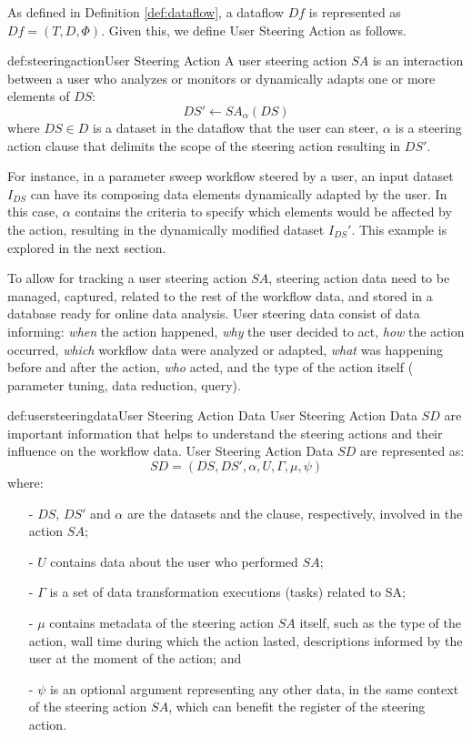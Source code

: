 As defined in Definition \ref{def:dataflow}, a dataflow $Df$ is represented as $Df = (T,D,\Phi)$. Given this, we define User Steering Action as follows.

\begin{mydef}{def:steeringaction}{User Steering Action}
A user steering action $SA$ is an interaction between a user who analyzes or monitors or dynamically adapts one or more elements of $DS$:
$$DS' \leftarrow SA_\alpha(DS)$$
where $DS \in D$ is a dataset in the dataflow that the user can steer, $\alpha$ is a steering action clause that delimits the scope of the steering action resulting in $DS'$.
\end{mydef}

For instance, in a parameter sweep workflow steered by a user, an input dataset $I_{DS}$ can have its composing data elements dynamically adapted by the user. In this case, $\alpha$ contains the criteria to specify which elements would be affected by the action, resulting in the dynamically modified dataset $I_{DS}'$. This example is explored in the next section.

To allow for tracking a user steering action $SA$, steering action data need to be managed, \ie{} captured, related to the rest of the workflow data, and stored in a database ready for online data analysis.
User steering data consist of data informing:
\textit{when} the action happened,
\textit{why} the user decided to act,
\textit{how} the action occurred,
\textit{which} workflow data were analyzed or adapted,
\textit{what} was happening before and after the action,
\textit{who} acted, and
the type of the action itself (\eg{} parameter tuning, data reduction, query).

\begin{mydef}{def:usersteeringdata}{User Steering Action Data}
User Steering Action Data $SD$ are important information that helps to understand the steering actions and their influence on the workflow data.
User Steering Action Data $SD$ are represented as:
$$SD = (
DS,
DS',
\alpha,
U,
\Gamma,
\mu,
\psi
)$$
where:
\begin{itemize}
    \setlength\itemsep{-2mm}
    \item[-] \noindent
        $DS$, $DS'$ and $\alpha$ are the datasets and the clause, respectively, involved in the action $SA$;
    \item[-] \noindent
        $U$ contains data about the user who performed $SA$;
    \item[-] \noindent
        $\Gamma$ is a set of data transformation executions (tasks) related to SA;
    \item[-] \noindent
        $\mu$ contains metadata of the steering action $SA$ itself, such as the type of the action, wall time during which the action lasted, descriptions informed by the user at the moment of the action; and
    \item[-] \noindent
        $\psi$ is an optional argument representing any other data, in the same context of the steering action $SA$, which can benefit the register of the steering action.
\end{itemize}

\end{mydef}

